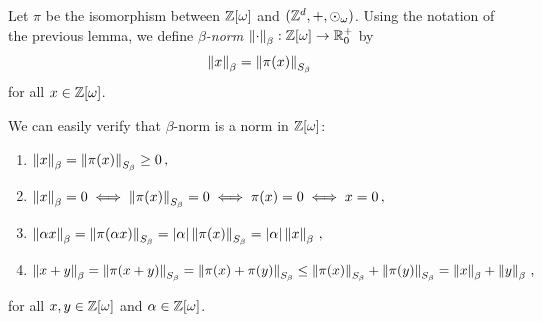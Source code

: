 \begin{defn}
Let $\pi$ be the isomorphism between $\mathbb{Z}[\omega]$ and $(\mathbb{Z}^d,+,\odot_\omega)$. Using the notation of the previous lemma, we define \emph{$\beta$-norm}  $\left\lVert\cdot\right\rVert_{\beta}:\mathbb{Z}[\omega] \rightarrow \mathbb{R}^+_0$ by 
$$
\left\lVert x\right\rVert_{\beta}=\left\lVert\pi(x)\right\rVert_{S_\beta}
$$
for all $x\in\mathbb{Z}[\omega]$.
\end{defn}
We can easily verify that $\beta$-norm is a norm in $\mathbb{Z}[\omega]$:
\begin{enumerate}
    \item $\left\lVert x\right\rVert_{\beta}=\left\lVert\pi(x)\right\rVert_{S_\beta}\geq 0\,,$
    \item $\left\lVert x\right\rVert_{\beta}=0 \iff \left\lVert\pi(x)\right\rVert_{S_\beta}=0 \iff \pi(x)=0 \iff x=0\,,$
    \item $\left\lVert\alpha x\right\rVert_{\beta}=\left\lVert\pi(\alpha x)\right\rVert_{S_\beta}=|\alpha|\left\lVert\pi(x)\right\rVert_{S_\beta}=|\alpha|\left\lVert x\right\rVert_{\beta}\,,$
    \item $\left\lVert x+y\right\rVert_{\beta}=\left\lVert\pi(x+y)\right\rVert_{S_\beta}=\left\lVert\pi(x)+\pi(y)\right\rVert_{S_\beta}\leq \left\lVert\pi(x)\right\rVert_{S_\beta}+\left\lVert\pi(y)\right\rVert_{S_\beta}=\left\lVert x\right\rVert_{\beta}+\left\lVert y\right\rVert_{\beta}\,,$
\end{enumerate}
for all $x,y \in \mathbb{Z}[\omega]$ and $\alpha \in \mathbb{Z}[\omega]$.

